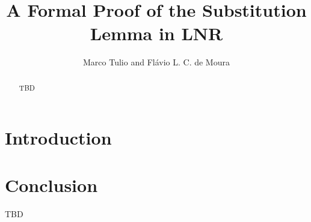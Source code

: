 \documentclass{llncs}
\title{A Formal Proof of the Substitution Lemma in LNR}
\author{Marco Tulio and Flávio L. C. de Moura}
\institute{Universidade de Brasília}
\begin{document}
\maketitle

\begin{abstract}
  TBD \cite{teamCoqProofAssistant2024}
\end{abstract}

\section{Introduction}

 

\section{Conclusion}

TBD



\end{document}
